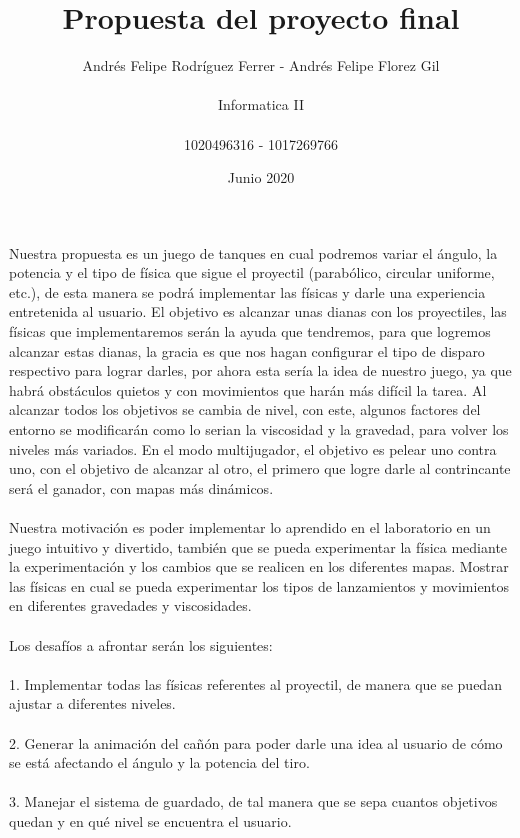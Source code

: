 \documentclass{article}
\title{Propuesta del proyecto final }
\author{Andrés Felipe Rodríguez Ferrer - Andrés Felipe Florez Gil\\\\Informatica II\\\\1020496316 - 1017269766}
\date{Junio 2020}
\begin{document}
\maketitle
Nuestra propuesta es un juego de tanques en cual podremos variar el ángulo, la potencia y el tipo de física que sigue el proyectil (parabólico, circular uniforme, etc.), de esta manera se podrá implementar las físicas y darle una experiencia entretenida al usuario. El objetivo es alcanzar unas dianas con los proyectiles, las físicas que implementaremos serán la ayuda que tendremos, para que logremos alcanzar estas dianas, la gracia es que nos hagan configurar el tipo de disparo respectivo para lograr darles, por ahora esta sería la idea de nuestro juego, ya que habrá obstáculos quietos y con movimientos que harán más difícil la tarea. Al alcanzar todos los objetivos se cambia de nivel, con este, algunos factores del entorno se modificarán como lo serian la viscosidad y la gravedad, para volver los niveles más variados. En el modo multijugador, el objetivo es pelear uno contra uno, con el objetivo de alcanzar al otro, el primero que logre darle al contrincante será el ganador, con mapas más dinámicos.\\\\
Nuestra motivación es poder implementar lo aprendido en el laboratorio en un juego intuitivo y divertido, también que se pueda experimentar la física mediante la experimentación y los cambios que se realicen en los diferentes mapas. Mostrar las físicas en cual se pueda experimentar los tipos de lanzamientos y movimientos en diferentes gravedades y viscosidades.\\\\Los desafíos a afrontar serán los siguientes:\\\\ 
1.	Implementar todas las físicas referentes al proyectil, de manera que se puedan ajustar a diferentes niveles.\\\\
2.	Generar la animación del cañón para poder darle una idea al usuario de cómo se está afectando el ángulo y la potencia del tiro.\\\\
3.  Manejar el sistema de guardado, de tal manera que se sepa cuantos objetivos quedan y en qué nivel se encuentra el usuario.
\end{document}
